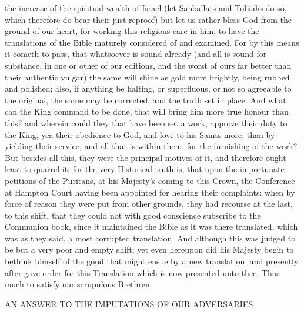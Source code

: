 {the increase of the spiritual wealth of Israel (let Sanballats and Tobiahs do so, which therefore do bear their just reproof) but let us rather bless God from the ground of our heart, for working this religious care in him, to have the translations of the Bible maturely considered of and examined. For by this means it cometh to pass, that whatsoever is sound already (and all is sound for substance, in one or other of our editions, and the worst of ours far better than their authentic vulgar) the same will shine as gold more brightly, being rubbed and polished; also, if anything be halting, or superfluous, or not so agreeable to the original, the same may be corrected, and the truth set in place. And what can the King command to be done, that will bring him more true honour than this? and wherein could they that have been set a work, approve their duty to the King, yea their obedience to God, and love to his Saints more, than by yielding their service, and all that is within them, for the furnishing of the work? But besides all this, they were the principal motives of it, and therefore ought least to quarrel it: for the very Historical truth is, that upon the importunate petitions of the Puritans, at his Majesty’s coming to this Crown, the Conference at Hampton Court having been appointed for hearing their complaints: when by force of reason they were put from other grounds, they had recourse at the last, to this shift, that they could not with good conscience subscribe to the Communion book, since it maintained the Bible as it was there translated, which was as they said, a most corrupted translation. And although this was judged to be but a very poor and empty shift; yet even hereupon did his Majesty begin to bethink himself of the good that might ensue by a new translation, and presently after gave order for this Translation which is now presented unto thee. Thus much to satisfy our scrupulous Brethren.
\par }{\IS AN ANSWER TO THE IMPUTATIONS OF OUR ADVERSARIES
}
